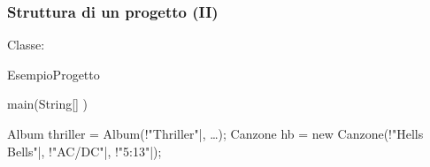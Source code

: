 \begin{frame}[fragile]\frametitle{Struttura di un progetto (II)}

  \begin{center}
  \end{center}

  Classe:
  \begin{JavaCodePlain}[commandchars=\\!|]
  
  \Jpublic \Jclass EsempioProgetto {
  
    \Jpublic \Jstatic \Jvoid main(String[] \Jargs) {
    
      Album thriller = \Jnew Album(\String!"Thriller"|, \dots);
      Canzone hb = new Canzone(\String!"Hells Bells"|, \String!"AC/DC"|, \String!"5:13"|);
    }
  }
  \end{JavaCodePlain}

\end{frame}
